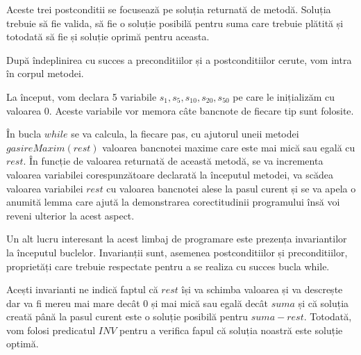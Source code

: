 \par
\vspace{0.25cm}
Aceste trei postconditii se focusează pe soluția returnată de metodă. Soluția trebuie să fie valida, să fie o soluție posibilă pentru suma care trebuie plătită și totodată să fie și soluție oprimă pentru aceasta.
\par 
După îndeplinirea cu succes a preconditiilor și a postconditiilor cerute, vom intra în corpul metodei. \par 
La început, vom declara 5 variabile $s_1, s_5 , s_{10}, s_{20}, s_{50}$ pe care le inițializăm cu valoarea 0. Aceste variabile vor memora câte bancnote de fiecare tip sunt folosite. \par 
În bucla $while$ se va calcula, la fiecare pas, cu ajutorul uneii metodei $gasireMaxim(rest)$ valoarea bancnotei maxime care este mai mică sau egală cu $rest$. În funcție de valoarea returnată de această metodă, se va incrementa valoarea variabilei corespunzătoare declarată la începutul metodei, va scădea valoarea variabilei $rest$ cu valoarea bancnotei alese la pasul curent și se va apela o anumită lemma care ajută la demonstrarea corectitudinii programului însă voi reveni ulterior la acest aspect.
\par 

Un alt lucru interesant la acest limbaj de programare este prezența invariantilor la începutul buclelor. Invarianții sunt, asemenea postconditiilor și preconditiilor, proprietăți care trebuie respectate pentru a se realiza cu succes bucla while.

\vspace{0.5cm}
\par 
\vspace{0.5cm}
Acești invarianti ne indică faptul că $rest$ își va schimba valoarea și va descrește dar va fi mereu mai mare decât 0 și mai mică sau egală decât $suma$ și că soluția creată până la pasul curent este o soluție posibilă pentru $suma-rest$. 
Totodată, vom folosi predicatul $INV$ pentru a verifica fapul că soluția noastră este soluție optimă. 
\par
